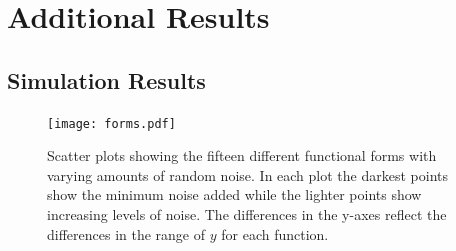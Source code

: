 \documentclass[a4paper, 12pt]{report}
\begin{document}
\appendix

\chapter{Additional Results}


\section{Simulation Results}

\begin{figure}[H]
\begin{centering}
\texttt{[image: forms.pdf]}
\caption{Scatter plots showing the fifteen different functional forms with varying amounts of random noise. In each plot the darkest points show the minimum noise added while the lighter points show increasing levels of noise. The differences in the y-axes reflect the differences in the range of $y$ for each function.} 
\label{F:FunctionFormsNoise}
\end{centering}
\end{figure}
\end{document}
